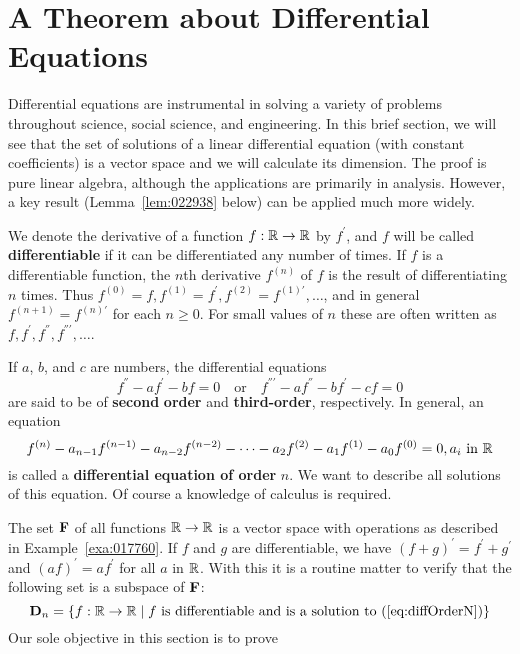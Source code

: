 \section{A Theorem about Differential Equations}
\label{sec:7_4}

Differential equations are instrumental in solving a variety of problems throughout science, social science, and engineering. In this brief section, we will see that the set of solutions of a linear differential equation (with constant coefficients) is a vector space and we will calculate its dimension. The proof is pure linear algebra, although the applications are primarily in analysis. However, a key result (Lemma~\ref{lem:022938} below) can be applied much more widely.


We denote the derivative of a function $f : \mathbb{R} \to \mathbb{R}$ by $f^\prime$, and $f$ will be called \textbf{differentiable} if it can be differentiated any number of times. If $f$ is a differentiable function, the $n$th derivative $f^{(n)}$ of $f$ is the result of differentiating $n$ times. Thus $f^{(0)} = f, f^{(1)} = f^\prime, f^{(2)} = f^{(1)\prime}, \dots$, and in general $f^{(n+1)} = f^{(n)\prime}$ for each $n \geq 0$. For small values of $n$ these are often written as $f, f^\prime, f^\dprime, f^{\dprime\prime}, \dots$.


If $a$, $b$, and $c$ are numbers, the differential equations
\begin{equation*}
f^\dprime - af^\prime - bf = 0 \quad \mbox{or} \quad f^{\dprime\prime} - af^\dprime - bf^\prime - cf = 0
\end{equation*}
are said to be of \textbf{second} \textbf{order} and \textbf{third-order}, respectively. In general, an equation
\begin{equation}\label{eq:diffOrderN}
f^{(n)} - a_{n-1}f^{(n-1)} - a_{n-2}f^{(n-2)} - \cdots - a_{2}f^{(2)} - a_{1}f^{(1)} - a_{0}f^{(0)} = 0, a_i \mbox{ in } \mathbb{R}
\end{equation}
is called a \textbf{differential equation of order} $n$. We want to describe all solutions of this equation. Of course a knowledge of calculus is required.


The set $\textbf{F}$ of all functions $\mathbb{R} \to \mathbb{R}$ is a vector space with operations as described in Example~\ref{exa:017760}. If $f$ and $g$ are differentiable, we have $(f + g)^\prime = f^\prime + g^\prime$ and $(af)^\prime = af^\prime$ for all $a$ in $\mathbb{R}$. With this it is a routine matter to verify that the following set is a subspace of $\textbf{F}$:
\begin{equation*}
\textbf{D}_n = \{f : \mathbb{R} \to \mathbb{R} \mid f \mbox{ is differentiable and is a solution to (\ref{eq:diffOrderN})}\}
\end{equation*}
Our sole objective in this section is to prove


